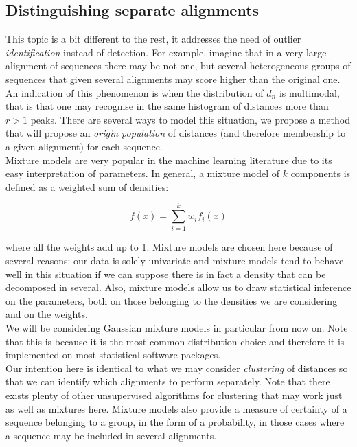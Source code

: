 \documentclass[a4paper]{llncs}
\begin{document}
\subsection{Distinguishing separate alignments}

This topic is a bit different to the rest, it addresses the need of outlier \textit{identification} instead of detection. For example, imagine that in a very large alignment of sequences there may be not one, but several heterogeneous groups of sequences that given several alignments may score higher than the original one.\\

An indication of this phenomenon is when the distribution of $d_n$ is multimodal, that is that one may recognise in the same histogram of distances more than $r > 1$ peaks. There are several ways to model this situation, we propose a method that will propose an \textit{origin population} of distances (and therefore membership to a given alignment) for each sequence.\\

Mixture models are very popular in the machine learning literature due to its easy interpretation of parameters. In general, a mixture model of $k$ components is defined as a weighted sum of densities:

\begin{equation}
f(x) = \sum_{i=1}^k w_i f_i(x)
\end{equation}

where all the weights add up to 1. Mixture models are chosen here because of several reasons: our data is solely univariate and mixture models tend to behave well in this situation if we can suppose there is in fact a density that can be decomposed in several. Also, mixture models allow us to draw statistical inference on the parameters, both on those belonging to the densities we are considering and on the weights.\\

We will be considering Gaussian mixture models in particular from now on. Note that this is because it is the most common distribution choice and therefore it is implemented on most statistical software packages.\\

Our intention here is identical to what we may consider \textit{clustering} of distances so that we can identify which alignments to perform separately. Note that there exists plenty of other unsupervised algorithms for clustering that may work just as well as mixtures here. Mixture models also provide a measure of certainty of a sequence belonging to a group, in the form of a probability, in those cases where a sequence may be included in several alignments.\\
\end{document}
